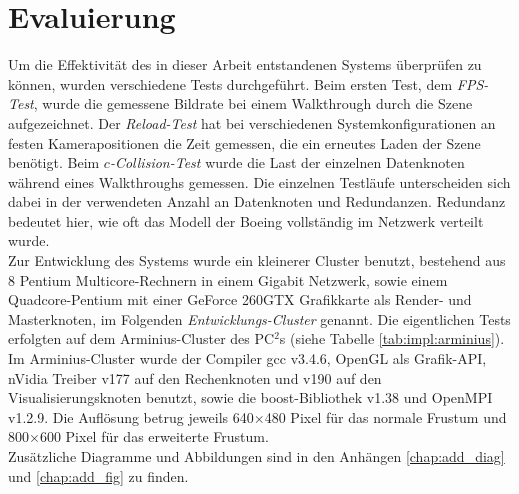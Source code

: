 \chapter{Evaluierung}
\label{chap:eval}
%
%

Um die Effektivität des in dieser Arbeit entstandenen Systems überprüfen zu können, wurden verschiedene Tests durchgeführt.
Beim ersten Test, dem \textit{FPS-Test}, wurde die gemessene Bildrate bei einem Walkthrough durch die Szene aufgezeichnet. Der \textit{Reload-Test} hat bei verschiedenen Systemkonfigurationen an festen Kamerapositionen die Zeit gemessen, die ein erneutes Laden der Szene benötigt. Beim \textit{$c$-Collision-Test} wurde die Last der einzelnen Datenknoten während eines Walkthroughs gemessen. Die einzelnen Testläufe unterscheiden sich dabei in der verwendeten Anzahl an Datenknoten und Redundanzen. Redundanz bedeutet hier, wie oft das Modell der Boeing vollständig im Netzwerk verteilt wurde. \\
Zur Entwicklung des Systems wurde ein kleinerer Cluster benutzt, bestehend aus 8 Pentium Multicore-Rechnern in einem Gigabit Netzwerk, sowie einem Quadcore-Pentium mit einer GeForce 260GTX Grafikkarte als Render- und Masterknoten, im Folgenden \textit{Entwicklungs-Cluster} genannt. Die eigentlichen Tests erfolgten auf dem Arminius-Cluster des PC$^2$s (siehe Tabelle \ref{tab:impl:arminius}).\\
Im Arminius-Cluster wurde der Compiler gcc v3.4.6, OpenGL als Grafik-API, nVidia Treiber v177 auf den Rechenknoten und v190 auf den Visualisierungsknoten benutzt, sowie die boost-Bibliothek v1.38 und OpenMPI v1.2.9. Die Auflösung betrug jeweils 640$\times$480 Pixel für das normale Frustum und 800$\times$600 Pixel für das erweiterte Frustum.\\
Zusätzliche Diagramme und Abbildungen sind in den Anhängen \ref{chap:add_diag} und \ref{chap:add_fig} zu finden.

